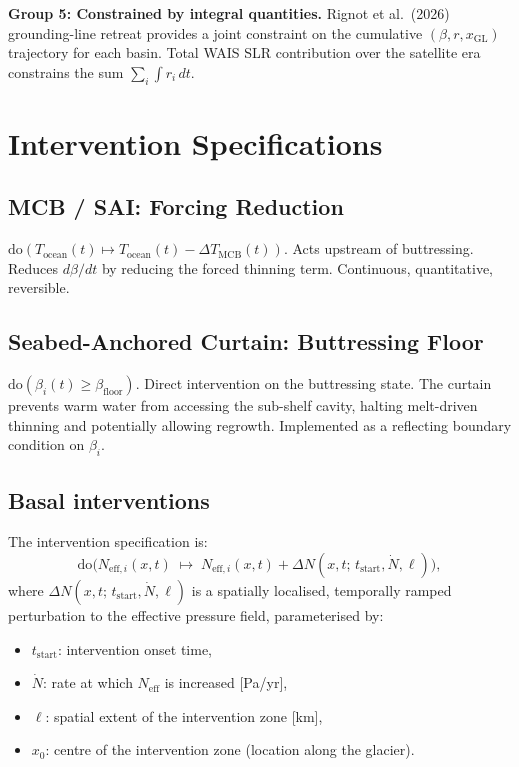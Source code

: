 \documentclass[11pt]{article}
\theoremstyle{definition}
\begin{document}
\textbf{Group 5: Constrained by integral quantities.}
Rignot et al.\ (2026) grounding-line retreat provides a joint constraint on the cumulative $(\beta, r, x_\text{GL})$ trajectory for each basin.  Total WAIS SLR contribution over the satellite era constrains the sum $\sum_i \int r_i \, dt$.


\section{Intervention Specifications}
\label{sec:interventions}

\subsection{MCB / SAI: Forcing Reduction}
$\text{do}(T_{\text{ocean}}(t) \mapsto T_{\text{ocean}}(t) - \Delta T_{\text{MCB}}(t))$.  Acts upstream of buttressing.  Reduces $d\beta/dt$ by reducing the forced thinning term.  Continuous, quantitative, reversible.

\subsection{Seabed-Anchored Curtain: Buttressing Floor}
$\text{do}(\beta_i(t) \geq \beta_{\text{floor}})$.  Direct intervention on the buttressing state.  The curtain prevents warm water from accessing the sub-shelf cavity, halting melt-driven thinning and potentially allowing regrowth.  Implemented as a reflecting boundary condition on $\beta_i$.

\subsection{Basal interventions}
\label{sec:tulaczyk}

The intervention specification is:
\begin{equation}
  \text{do}\bigl(N_{\text{eff},i}(x, t) \;\mapsto\; N_{\text{eff},i}(x, t) + \Delta N(x, t;\, t_{\text{start}}, \dot{N}, \ell)\bigr),
\end{equation}
where $\Delta N(x, t;\, t_{\text{start}}, \dot{N}, \ell)$ is a spatially localised, temporally ramped perturbation to the effective pressure field, parameterised by:
\begin{itemize}
  \item $t_{\text{start}}$: intervention onset time,
  \item $\dot{N}$: rate at which $N_{\text{eff}}$ is increased [Pa/yr],
  \item $\ell$: spatial extent of the intervention zone [km],
  \item $x_0$: centre of the intervention zone (location along the glacier).
\end{itemize}
\end{document}
